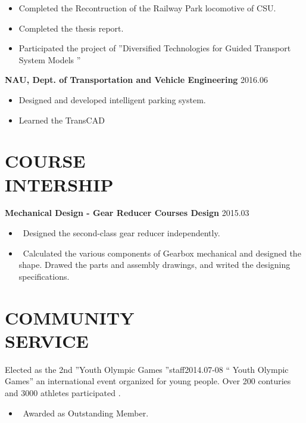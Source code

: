 \documentclass[margin]{res}
\begin{document}
\begin{resume}
                 \begin{itemize}  
                 \itemsep -2pt %
                 \item  Completed the Recontruction of  the Railway Park locomotive of CSU.
                \item   Completed the thesis report.
                \item   Participated the project of ''Diversified Technologies for Guided Transport System Models  ''
                \end{itemize}
 
               \textbf { NAU, Dept. of Transportation and Vehicle Engineering   } \hfill 2016.06
                 \begin{itemize}  \itemsep -2pt %
                 \item Designed and developed intelligent parking system.
                 \item Learned the TransCAD 
                 \end{itemize} 
               
\section{COURSE \\ INTERSHIP}  \textbf {Mechanical Design - Gear Reducer Courses Design} \hfill{2015.03}
\begin{itemize}  
                 \item \ Designed the second-class gear reducer independently. 
                 \item \ Calculated the various components of Gearbox mechanical and designed the shape. Drawed the parts and assembly drawings, and writed the designing specifications.
                 \end{itemize} 



\section{COMMUNITY \\ SERVICE}  Elected as the 2nd ''Youth Olympic Games ''staff\hfill{2014.07-08}
                 \newline `` Youth Olympic Games''  an international event organized for young people. Over 200 conturies and 3000 athletes participated . 
  \begin{itemize}  
  \item \ Awarded as Outstanding Member.
   \end{itemize} 

\end{resume}
\end{document}
